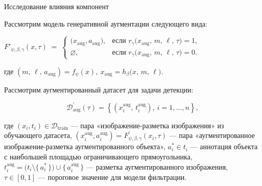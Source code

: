 \documentclass{beamer}
\begin{document}
\begin{frame}{Исследование влияния компонент}

\small{
\begin{center}
Рассмотрим модель генеративной аугментации следующего вида:
\end{center}
\begin{center}
$F'_{\psi,\beta,\gamma}(x, \tau) \;=\;
\begin{cases}
\bigl(x_{\text{aug}}, a_{\text{aug}}), 
& \text{если } r_{\gamma}\bigl(x_{\text{aug}},\,m,\,\ell,\,\tau\bigr) = 1,\\[1em]
\varnothing, 
& \text{если } r_{\gamma}\bigl(x_{\text{aug}},\,m,\,\ell,\,\tau\bigr) = 0.
\end{cases}
$
\end{center}
где 
$ 
(m,\,\ell,\, a_{\text{aug}}) = f_{\psi}(x),  \ x_{\text{aug}} = h_{\beta}\bigl(x,\,m,\, \ell \bigr)$.
\begin{center}
Рассмотрим аугментированный датасет для задачи детекции:
\end{center}
\[
\mathcal{D}^{'}_{\text{aug}}(\tau) =
\left\{
  (x_i^{\text{aug}},\,t_i^{\text{aug}}), \
  i = 1,\dots,n
\right\},
\]

где $(x_i, t_i) \in \mathcal{D}_{\mathrm{train}}$ — пара «изображение-разметка изображения» из обучающего датасета,
$(x_i^{\mathrm{aug}}, a_i^{\mathrm{aug}}) = F^{'}_{\psi,\beta,\gamma}(x_i, \tau)$ — пара «аугментированное изображение-разметка аугментированного объекта»,
$a_i^* \in t_i$ — аннотация объекта с наибольшей площадью ограничивающего прямоугольника,
$t_i^{\mathrm{aug}} = \bigl(t_i \setminus \{\,a_i^*\,\}\bigr) \cup \{\,a_i^{\mathrm{aug}}\,\}$ — разметка аугментированного изображения,
$\tau \in [0,1]$ — пороговое значение для модели фильтрации.}


\end{frame}
\end{document}
